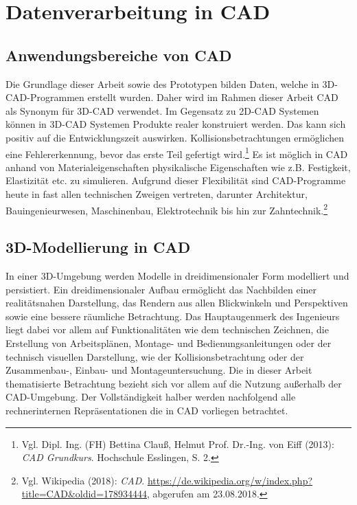 \chapter{Datenverarbeitung in CAD}
\section{Anwendungsbereiche von CAD}
\label{sec:DatenverarbeitungInCAD}

Die Grundlage dieser Arbeit sowie des Prototypen bilden Daten, welche in 3D-CAD-Programmen erstellt wurden. Daher wird im Rahmen dieser Arbeit CAD als Synonym für 3D-CAD verwendet. Im Gegensatz zu 2D-CAD Systemen können in 3D-CAD Systemen Produkte realer konstruiert werden. Das kann sich positiv auf die Entwicklungszeit auswirken. Kollisionsbetrachtungen ermöglichen eine Fehlererkennung, bevor das erste Teil gefertigt wird.\footnote{Vgl. Dipl. Ing. (FH) Bettina Clauß, Helmut Prof. Dr.-Ing. von Eiff (2013): \textit{CAD Grundkurs}. Hochschule Esslingen, S. 2.} Es ist möglich in CAD anhand von Materialeigenschaften physikalische Eigenschaften wie z.B. Festigkeit, Elastizität etc. zu simulieren. Aufgrund dieser Flexibilität sind CAD-Programme heute in fast allen technischen Zweigen vertreten, darunter Architektur, Bauingenieurwesen, Maschinenbau, Elektrotechnik bis hin zur Zahntechnik.\footnote{Vgl. Wikipedia  (2018): \textit{CAD}.\newline
\url{https://de.wikipedia.org/w/index.php?title=CAD&oldid=178934444},\newline 
abgerufen am 23.08.2018.}


\section{3D-Modellierung in CAD}
\label{sec:3D-ModellierungInCAD}
In einer 3D-Umgebung werden Modelle in dreidimensionaler Form modelliert und persistiert. Ein dreidimensionaler Aufbau ermöglicht das Nachbilden einer realitätsnahen Darstellung, das Rendern aus allen Blickwinkeln und Perspektiven sowie eine bessere räumliche Betrachtung. Das Hauptaugenmerk des Ingenieurs liegt dabei vor allem auf Funktionalitäten wie dem technischen Zeichnen, die Erstellung von Arbeitsplänen, Montage- und Bedienungsanleitungen oder der technisch visuellen Darstellung, wie der Kollisionsbetrachtung oder der
Zusammenbau-, Einbau- und Montageuntersuchung. 
Die in dieser Arbeit thematisierte Betrachtung bezieht sich vor allem auf die Nutzung außerhalb der CAD-Umgebung.  Der Vollständigkeit halber werden nachfolgend alle rechnerinternen Repräsentationen die in CAD vorliegen betrachtet.

